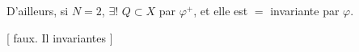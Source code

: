 D'ailleurs, si $N=2$, $\exists!$  $Q\subset X$  par $\varphi^+$, et elle est $=$ invariante par $\varphi$.

[ faux. Il       invariantes ]

